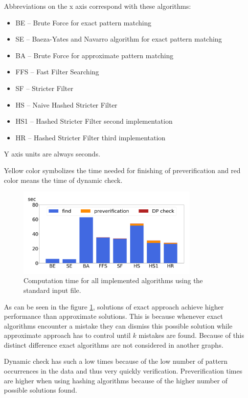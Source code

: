 Abbreviations on the x axis correspond with these algorithms:
\begin{itemize}
\item BE -- Brute Force for exact pattern matching
\item SE -- Baeza-Yates and Navarro algorithm for exact pattern matching
\item BA -- Brute Force for approximate pattern matching
\item FFS -- Fast Filter Searching
\item SF -- Stricter Filter
\item HS -- Naive Hashed Stricter Filter
\item HS1 -- Hashed Stricter Filter second implementation
\item HR -- Hashed Stricter Filter third implementation
\end{itemize}

Y axis units are always seconds.

Yellow color symbolizes the time needed for finishing of preverification and red color means the time of dynamic check.

\begin{figure}
\centering
\includegraphics[width=0.8\textwidth]{img/baseAll}
\caption{Computation time for all implemented algorithms using the standard input file.}
\label{fig_compT}
\end{figure}

As can be seen in the figure \ref{fig_compT}, solutions of exact approach achieve higher performance than approximate solutions. This is because whenever exact algorithms encounter a mistake they can dismiss this possible solution while approximate approach has to control until $k$ mistakes are found. Because of this distinct difference exact algorithms are not considered in another graphs.

Dynamic check has such a low times because of the low number of pattern occurrences in the data and thus very quickly verification. Preverification times are higher when using hashing algorithms because of the higher number of possible solutions found.

